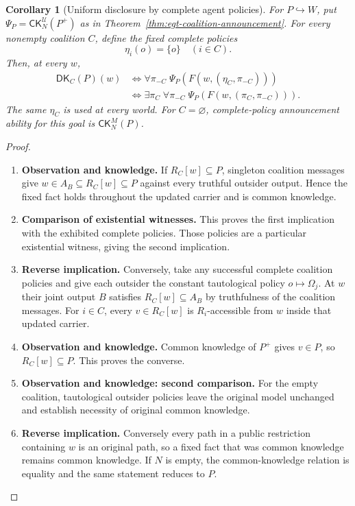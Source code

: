 \documentclass[11pt,a4paper]{article}
\numberwithin{equation}{section}
\newtheorem{corollary}[theorem]{Corollary}
\theoremstyle{definition}
\theoremstyle{remark}
\theoremstyle{plain}
\begin{document}
\begin{corollary}[Uniform disclosure by complete agent policies]
\label{cor:egt-uniform-agent-disclosure}
For $P\hookrightarrow W$, put
$\Psi_P=\mathsf{CK}_N^{\mathcal U}(P^+)$ as in
Theorem~\ref{thm:egt-coalition-announcement}. For every nonempty coalition
$C$, define the fixed complete policies
\[
 \eta_i(o)=\{o\}\quad(i\in C).
\]
Then, at every $w$,
\[
 \begin{aligned}
 \mathsf{DK}_C(P)(w)
 &\iff \forall\pi_{-C}\;
          \Psi_P(F(w,(\eta_C,\pi_{-C})))\\
 &\iff \exists\pi_C\;\forall\pi_{-C}\;
          \Psi_P(F(w,(\pi_C,\pi_{-C}))).
 \end{aligned}
\]
The same $\eta_C$ is used at every world. For $C=\varnothing$, complete-policy
announcement ability for this goal is $\mathsf{CK}_N^M(P)$.
\end{corollary}

\begin{proof}
\leavevmode
\begin{enumerate}[label=\textup{(\arabic*)},leftmargin=*,itemsep=4pt,topsep=3pt]
  \item \textbf{Observation and knowledge.} If $R_C[w]\subseteq P$, singleton coalition messages give
$w\in A_B\subseteq R_C[w]\subseteq P$ against every truthful outsider
output. Hence the fixed fact holds throughout the updated carrier and is
common knowledge.
  \item \textbf{Comparison of existential witnesses.} This proves the first implication with the exhibited
complete policies. Those policies are a particular existential witness,
giving the second implication.
  \item \textbf{Reverse implication.} Conversely, take any successful complete coalition policies and give each
outsider the constant tautological policy $o\mapsto\Omega_j$. At $w$ their
joint output $B$ satisfies $R_C[w]\subseteq A_B$ by truthfulness of the
coalition messages. For $i\in C$, every $v\in R_C[w]$ is $R_i$-accessible
from $w$ inside that updated carrier.
  \item \textbf{Observation and knowledge.} Common knowledge of $P^+$ gives
$v\in P$, so $R_C[w]\subseteq P$. This proves the converse.
  \item \textbf{Observation and knowledge: second comparison.} For the empty coalition, tautological outsider policies leave the original
model unchanged and establish necessity of original common knowledge.
  \item \textbf{Reverse implication.} Conversely every path in a public restriction containing $w$ is an original
path, so a fixed fact that was common knowledge remains common knowledge. If $N$ is empty, the common-knowledge relation is equality and the same
statement reduces to $P$.
\end{enumerate}
\end{proof}
\end{document}
